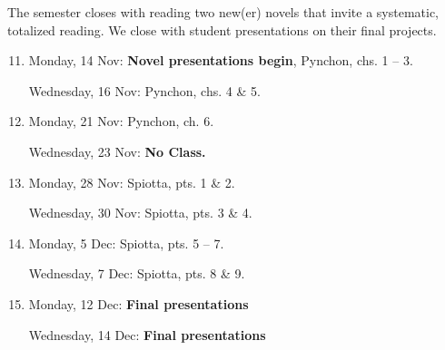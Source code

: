   The semester closes with reading two new(er) novels that invite a systematic,
  totalized reading. We close with student presentations on their final
  projects.

\begin{enumerate}
  \setcounter{enumi}{10}

  \item Monday, 14 Nov: \textbf{\small Novel presentations begin}, Pynchon, chs. 1 -- 3.
  
    Wednesday, 16 Nov: Pynchon, chs. 4 \& 5.

  \item Monday, 21 Nov: Pynchon, ch. 6.

    Wednesday, 23 Nov: \textbf{No Class.}

  \item Monday, 28 Nov: Spiotta, pts. 1 \& 2.

    Wednesday, 30 Nov: Spiotta, pts. 3 \& 4.

  \item Monday, 5 Dec: Spiotta, pts. 5 -- 7.

    Wednesday, 7 Dec: Spiotta, pts. 8 \& 9.

  \item Monday, 12 Dec: \textbf{\small Final presentations}
  
    Wednesday, 14 Dec: \textbf{\small Final presentations}

\end{enumerate}
